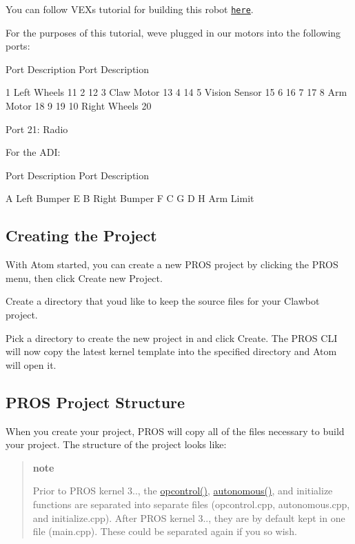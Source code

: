 You can follow V\+EX\textquotesingle{}s tutorial for building this robot \href{https://v5beta.vex.com/parent-wrapper.php?id=v5-with-clawbot}{\tt here}.

For the purposes of this tutorial, we\textquotesingle{}ve plugged in our motors into the following ports\+:

Port Description Port Description 



1 Left Wheels 11 2 12 3 Claw Motor 13 4 14 5 Vision Sensor 15 6 16 7 17 8 Arm Motor 18 9 19 10 Right Wheels 20

Port 21\+: Radio

For the A\+DI\+:

Port Description Port Description 



A Left Bumper E B Right Bumper F C G D H Arm Limit

\subsection*{Creating the Project}

With Atom started, you can create a new P\+R\+OS project by clicking the {\ttfamily P\+R\+OS} menu, then click {\ttfamily Create new Project}.

Create a directory that you\textquotesingle{}d like to keep the source files for your Clawbot project.

Pick a directory to create the new project in and click Create. The P\+R\+OS C\+LI will now copy the latest kernel template into the specified directory and Atom will open it.

\subsection*{P\+R\+OS Project Structure}

When you create your project, P\+R\+OS will copy all of the files necessary to build your project. The structure of the project looks like\+:

\begin{quote}
{\bfseries note}

Prior to P\+R\+OS kernel 3.., the {\ttfamily \hyperlink{main_8h_a1903abdb5ef0f301d660754c8315fc17}{opcontrol()}}, {\ttfamily \hyperlink{main_8h_a2df3d06bc5bced154da27fce393f991f}{autonomous()}}, and initialize functions are separated into separate files (opcontrol.\+cpp, autonomous.\+cpp, and initialize.\+cpp). After P\+R\+OS kernel 3.., they are by default kept in one file (main.\+cpp). These could be separated again if you so wish. \end{quote}


